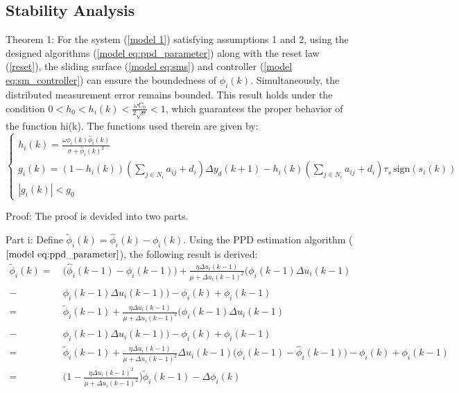 \documentclass[journal,onecolumn]{IEEEtran}
\begin{document}
\subsection{Stability Analysis}

Theorem 1: For the system (\ref{model 1}) satisfying assumptions 1 and 2, using  the designed algorithms (\ref{model eq:ppd_parameter}) along with the reset law (\ref{reset}), the sliding surface (\ref{model eq:sms}) and controller (\ref{model eq:sm_controller}) can ensure the boundedness of $ \hat{\phi}_i(k) $. Simultaneously, the distributed measurement error remains bounded. This result holds under the condition $ 0<h_0<h_i(k)<\frac{\omega C_0}{2 \sqrt{\sigma}} <1  $, which guarantees the proper behavior of the function hi(k). The functions used therein are given by: 
\[
\begin{cases} 
    h_i(k) = \frac{\omega \phi_i(k) \hat{\phi}_i(k)}{\sigma + \hat{\phi}_i(k)^2} \\
    g_i(k) = (1 - h_i(k))\left( \sum_{j \in N_i} a_{ij} + d_i \right)\Delta y_d(k+1) - h_i(k)\left( \sum_{j \in N_i} a_{ij} + d_i \right)\tau_s\, \text{sign}(s_i(k)) \\
    |g_i(k)| < g_0
\end{cases}
\]

Proof: The proof is devided into two parts.

Part i: Define $\tilde{\phi}_i(k) = \hat{\phi}_i(k) - \phi_i(k)$. Using the PPD estimation algorithm ($\ref{model eq:ppd_parameter}$), the following result is derived:
\begin{align}
    \label{model:phi_tilde_update}
    \tilde{\phi}_i(k) = \ & \big( \hat{\phi}_i(k-1) - \phi_i(k-1) \big) + \frac{\eta \Delta u_i(k-1)}{\mu + \Delta u_i(k-1)^2} \big( \phi_i(k-1) \Delta u_i(k-1) \quad \nonumber \\
    - \ & \hat{\phi}_i(k-1) \Delta u_i(k-1)\big) - \phi_i(k) + \phi_i(k-1) \quad \nonumber \\
    = \ & \tilde{\phi}_i(k-1) + \frac{\eta \Delta u_i(k-1)}{\mu + \Delta u_i(k-1)^2} \big( \phi_i(k-1) \Delta u_i(k-1) \quad \nonumber \\
    - \ & \hat{\phi}_i(k-1) \Delta u_i(k-1)\big) - \phi_i(k) + \phi_i(k-1) \quad \nonumber \\
    = \ & \tilde{\phi}_i(k-1) + \frac{\eta \Delta u_i(k-1)}{\mu + \Delta u_i(k-1)^2} \Delta u_i(k-1) \big( \phi_i(k-1) - \hat{\phi}_i(k-1) \big) - \phi_i(k) + \phi_i(k-1) \quad \nonumber \\
    = \ & \bigg( 1 - \frac{\eta \Delta u_i(k-1)^2}{\mu + \Delta u_i(k-1)^2} \bigg) \tilde{\phi}_i(k-1) - \Delta \phi_i(k)
\end{align}
\end{document}
